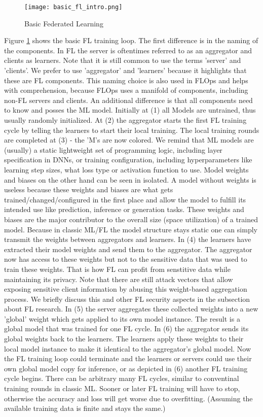 \begin{figure}%
    \centering
    \texttt{[image: basic\_fl\_intro.png]}
    \caption{Basic Federated Learning}
    \label{fig:basic_fl_intro}
\end{figure}
Figure \ref{fig:basic_fl_intro} shows the basic FL training loop.
The first difference is in the naming of the components.
In FL the server is oftentimes referred to as an aggregator
and clients as learners.
Note that it is still common to use the terms 'server' and 'clients'.
We prefer to use 'aggregator' and 'learners' because it highlights that these are FL components.
This naming choice is also used in FLOps and helps with comprehension,
because FLOps uses a manifold of components, including non-FL servers and clients.
An additional difference is that all components need to know and posses the ML model.
Initially at (1) all Models are untrained, thus usually randomly initialized.
At (2) the aggregator starts the first FL training cycle by telling the learners
to start their local training.
The local training rounds are completed at (3) - the 'M's are now colored.
We remind that ML models are (usually) a static lightweight set of
programming logic, including layer specification in DNNs, or training configuration,
including hyperparameters like learning step sizes, what loss type or
activation function to use.
Model weights and biases on the other hand can be seen in isolated.
A model without weights is useless because these weights and biases
are what gets trained/changed/configured in the first place and allow
the model to fulfill its intended use like prediction, inference or generation tasks.
These weights and biases are the major contributor to the 
overall size (space utilization) of a trained model.
Because in classic ML/FL the model structure stays static
one can simply transmit the weights between aggregators and learners.
In (4) the learners have extracted their model weights and send them to the aggregator.
The aggregator now has access to these weights but not
to the sensitive data that was used to train these weights.
That is how FL can profit from senstitive data while maintaining its privacy.
Note that there are still attack vectors that allow exposing sensitive client information
by abusing this weight-based aggregation process.
We briefly discuss this and other FL security aspects in the 
subsection about FL research.
In (5) the server aggregates these collected weights into
a new 'global' weight which gets applied to its own model instance.
The result is a global model that was trained for one FL cycle.
In (6) the aggregator sends its global weights back to the learners.
The learners apply these weights to their local model instance
to make it identical to the aggregator's global model.
Now the FL training loop could terminate and the learners or servers
could use their own global model copy for inference, or
as depicted in (6) another FL training cycle begins.
There can be arbitrary many FL cycles, similar to conventinal training rounds
in classic ML. Sooner or later FL training will have to stop,
otherwise the accuracy and loss will get worse due to overfitting.
(Assuming the available training data is finite and stays the same.)

